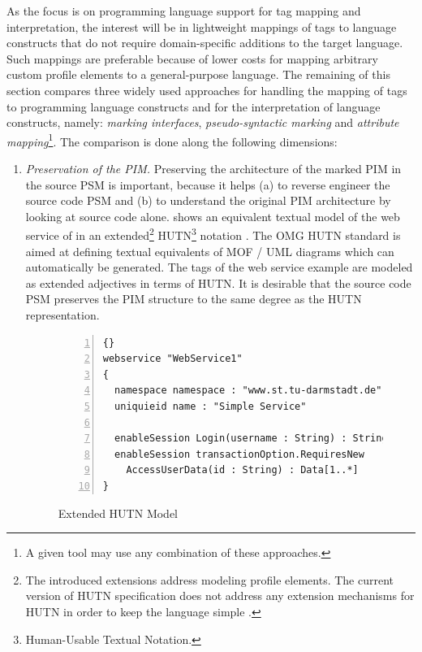 As the focus is on programming language support for tag mapping and interpretation, the interest will be in lightweight mappings of tags to language constructs that do not require domain-specific additions to the target language. Such mappings are preferable because of lower costs for mapping arbitrary custom profile elements to a general-purpose language. The remaining of this section compares three widely used approaches for handling the mapping of tags to programming language constructs and for the interpretation of language constructs, namely: \textit{marking interfaces}, \textit{pseudo-syntactic marking} and \textit{attribute mapping}\footnote{A given tool may use any combination of these approaches.}. The comparison is done along the following dimensions:

\begin{enumerate}
\item \textit{Preservation of the PIM.} Preserving the architecture of the marked PIM in the source PSM is important, because it helps (a) to reverse engineer the source code PSM and (b) to understand the original PIM architecture by looking at source code alone.  shows an equivalent textual model of the web service of  in an extended\footnote{The introduced extensions address modeling profile elements. The current version of HUTN specification does not address any extension mechanisms for HUTN in order to keep the language simple \cite{hutn.dipl}.} HUTN\footnote{Human-Usable Textual Notation.} notation \cite{hutn}. The OMG HUTN standard is aimed at defining textual equivalents of MOF / UML diagrams which can automatically be generated. The tags of the web service example are modeled as extended adjectives in terms of HUTN. It is desirable that the source code PSM preserves the PIM structure to the same degree as the HUTN representation.

\begin{figure}[ht]
	\begin{center}
	\begin{minipage}[t]{8cm}
		\begin{scriptsize}
		\begin{lstlisting}[numbers=left,frame=leftline,showstringspaces=false]{}
webservice "WebService1"
{
  namespace namespace : "www.st.tu-darmstadt.de"
  uniquieid name : "Simple Service"

  enableSession Login(username : String) : String
  enableSession transactionOption.RequiresNew
    AccessUserData(id : String) : Data[1..*]
}		
\end{lstlisting}
		\end{scriptsize}
		\end{minipage}
	\end{center}
	\caption{Extended HUTN Model}
	\label{fig.text.1}
\end{figure}


\end{enumerate}
